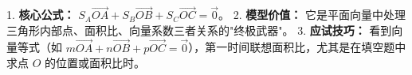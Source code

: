 \begin{summarybox}
1. \textbf{核心公式：} $S_A \vec{OA} + S_B \vec{OB} + S_C \vec{OC} = \vec{0}$。
2. \textbf{模型价值：} 它是平面向量中处理三角形内部点、面积比、向量系数三者关系的"终极武器"。
3. \textbf{应试技巧：} 看到向量等式（如 $m\vec{OA} + n\vec{OB} + p\vec{OC} = \vec{0}$），第一时间联想面积比，尤其是在填空题中求点 $O$ 的位置或面积比时。
\end{summarybox}